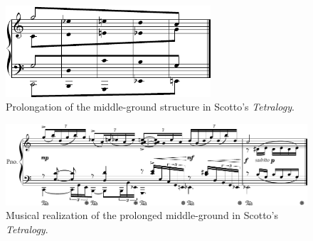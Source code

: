 \begin{example}
\begin{figure}[H]
    	\centering
    	\includegraphics[width=3in]{figures/Scotto_Schenker_2.pdf}
    	\caption[Prolongation of the middle-ground structure in Scotto's \emph{Tetralogy}]{Prolongation of the middle-ground structure in Scotto's \emph{Tetralogy}.}
    	\label{fig:scotto-schenker2}
	\end{figure}
	\begin{figure}[H]
    	\centering
    	\includegraphics[width=6.5in]{figures/Scotto_2.pdf}
    	\caption[Musical realization of the prolonged middle-ground in Scotto's \emph{Tetralogy}]{Musical realization of the prolonged middle-ground in Scotto's \emph{Tetralogy}.}
    	\label{fig:scotto-music2}
	\end{figure}
\end{example}

